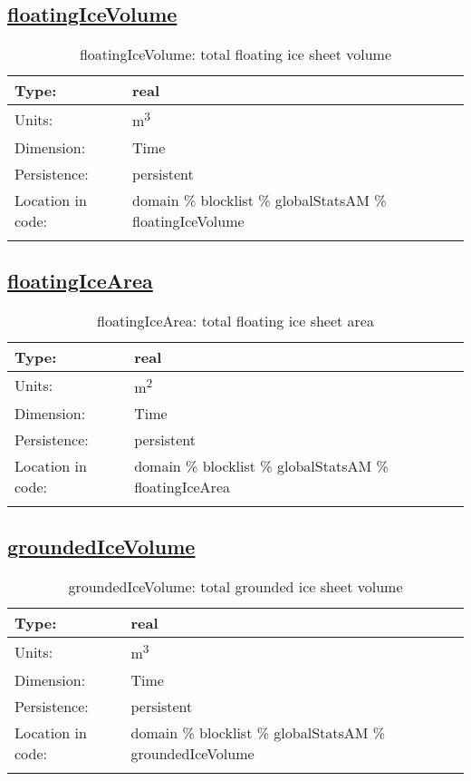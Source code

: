 \subsection[floatingIceVolume]{\hyperref[sec:var_tab_globalStatsAM]{floatingIceVolume}}
\label{subsec:var_sec_globalStatsAM_floatingIceVolume}
\begin{center}
\begin{longtable}{| p{2.0in} | p{4.0in} |}
        \hline 
        Type: & real \\
        \hline 
        Units: & \si{m^3} \\
        \hline 
        Dimension: & Time \\
        \hline 
        Persistence: & persistent \\
        \hline 
         Location in code: & domain \% blocklist \% globalStatsAM \% floatingIceVolume \\
         \hline 
    \caption{floatingIceVolume: total floating ice sheet volume}
\end{longtable}
\end{center}
\subsection[floatingIceArea]{\hyperref[sec:var_tab_globalStatsAM]{floatingIceArea}}
\label{subsec:var_sec_globalStatsAM_floatingIceArea}
\begin{center}
\begin{longtable}{| p{2.0in} | p{4.0in} |}
        \hline 
        Type: & real \\
        \hline 
        Units: & \si{m^2} \\
        \hline 
        Dimension: & Time \\
        \hline 
        Persistence: & persistent \\
        \hline 
         Location in code: & domain \% blocklist \% globalStatsAM \% floatingIceArea \\
         \hline 
    \caption{floatingIceArea: total floating ice sheet area}
\end{longtable}
\end{center}
\subsection[groundedIceVolume]{\hyperref[sec:var_tab_globalStatsAM]{groundedIceVolume}}
\label{subsec:var_sec_globalStatsAM_groundedIceVolume}
\begin{center}
\begin{longtable}{| p{2.0in} | p{4.0in} |}
        \hline 
        Type: & real \\
        \hline 
        Units: & \si{m^3} \\
        \hline 
        Dimension: & Time \\
        \hline 
        Persistence: & persistent \\
        \hline 
         Location in code: & domain \% blocklist \% globalStatsAM \% groundedIceVolume \\
         \hline 
    \caption{groundedIceVolume: total grounded ice sheet volume}
\end{longtable}
\end{center}
